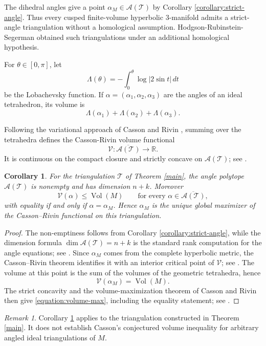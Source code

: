 \documentclass[oneside,a4paper,12pt]{article}
\newcommand{\R}{\mathbb R}
\newcommand{\T}{\mathcal T}
\newcommand{\Vol}{\operatorname{Vol}}
\theoremstyle{plain}
\newtheorem{corollary}[theorem]{Corollary}
\theoremstyle{definition}
\theoremstyle{remark}
\newtheorem{remark}[theorem]{Remark}
\numberwithin{equation}{section}
\begin{document}
The dihedral angles give a point $\alpha_M\in\mathcal A(\T)$ by Corollary \ref{corollary:strict-angle}. Thus every cusped finite-volume hyperbolic $3$-manifold admits a strict-angle triangulation without a homological assumption. Hodgson-Rubinstein-Segerman \cite{HRS} obtained such triangulations under an additional homological hypothesis.

For $\theta\in[0,\pi]$, let
\begin{equation}
\Lambda(\theta)=-\int_0^\theta \log|2\sin t|\,dt
  \nonumber \end{equation}
be the Lobachevsky function. If $\alpha=(\alpha_1,\alpha_2,\alpha_3)$ are the angles of an ideal tetrahedron, its volume is
\begin{equation}
\Lambda(\alpha_1)+\Lambda(\alpha_2)+\Lambda(\alpha_3).
  \nonumber \end{equation}

Following the variational approach of Casson and Rivin \cite{FG,Riv}, summing over the tetrahedra defines the Casson-Rivin volume functional
\begin{equation}
\mathcal V:\overline{\mathcal A(\T)}\longrightarrow\R.
  \nonumber \end{equation}
It is continuous on the compact closure and strictly concave on $\mathcal A(\T)$; see \cite{FG}.

\begin{corollary}\label{corollary:casson-rivin}
For the triangulation $\T$ of Theorem \ref{main}, the angle polytope $\mathcal A(\T)$ is nonempty and has dimension $n+k$. Moreover
\begin{equation}\label{equation:volume-max}
\mathcal V(\alpha)\leq \Vol(M)
\qquad\text{for every }\alpha\in\overline{\mathcal A(\T)},
\end{equation}
with equality if and only if $\alpha=\alpha_M$. Hence $\alpha_M$ is the unique global maximizer of the Casson--Rivin functional on this triangulation.
\end{corollary}

\begin{proof}
The non-emptiness follows from Corollary \ref{corollary:strict-angle}, while the dimension formula $\dim\mathcal A(\T)=n+k$ is the standard rank computation for the angle equations; see \cite{FG}. Since $\alpha_M$ comes from the complete hyperbolic metric, the Casson--Rivin theorem identifies it with an interior critical point of $\mathcal V$; see \cite{FG}. The volume at this point is the sum of the volumes of the geometric tetrahedra, hence
\begin{equation}
\mathcal V(\alpha_M)=\Vol(M).
  \nonumber \end{equation}
The strict concavity and the volume-maximization theorem of Casson and Rivin then give \eqref{equation:volume-max}, including the equality statement; see \cite{FG,Riv}.
\end{proof}
\begin{remark}
Corollary \ref{corollary:casson-rivin} applies to the triangulation constructed in Theorem \ref{main}. It does not establish Casson's conjectured volume inequality for arbitrary angled ideal triangulations of $M$.
\end{remark}
\end{document}
